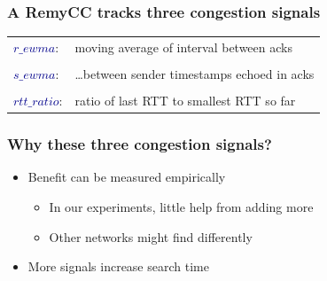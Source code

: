 \documentclass[svgnames]{beamer}
\begin{document}
\begin{frame}
\frametitle{A RemyCC tracks three congestion signals}

\large

\begin{centering}
\noindent \hspace{-0.75 cm}\begin{tabular}{ll}
\textcolor{DarkBlue}{$r\_ewma$}: & moving average of interval between acks \\

\\

\textcolor{DarkBlue}{$s\_ewma$}: & \ldots between sender timestamps echoed in acks \\

\\

\textcolor{DarkBlue}{$rtt\_ratio$}: & ratio of last RTT to smallest RTT so far \\

\end{tabular}

\end{centering}
\end{frame}

\begin{frame}
\frametitle{Why these three congestion signals?}

\Large

\begin{itemize}

\item Benefit can be measured empirically

\begin{itemize}
\item In our experiments, little help from adding more
\item Other networks might find differently
\end{itemize}

\item More signals increase search time

\end{itemize}

\end{frame}
\end{document}
